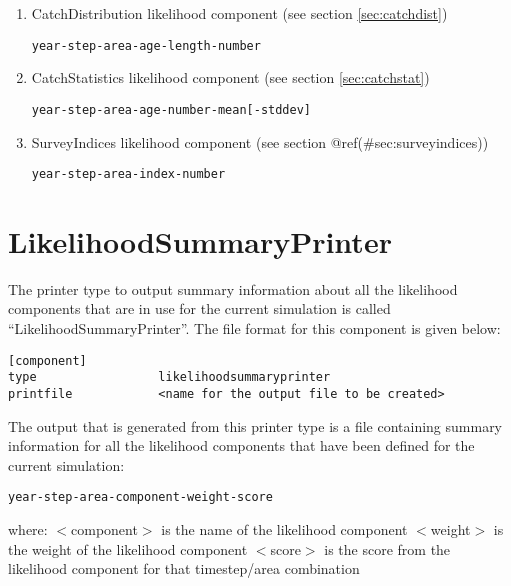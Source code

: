 \documentclass[]{book}
\begin{document}
\begin{enumerate}
\def\labelenumi{\arabic{enumi}.}
\item
  CatchDistribution likelihood component (see
  section \ref{sec:catchdist})

\begin{verbatim}
year-step-area-age-length-number
\end{verbatim}
\item
  CatchStatistics likelihood component (see
  section \ref{sec:catchstat})

\begin{verbatim}
year-step-area-age-number-mean[-stddev]
\end{verbatim}
\item
  SurveyIndices likelihood component (see
  section @ref(\#sec:surveyindices))

\begin{verbatim}
year-step-area-index-number
\end{verbatim}
\end{enumerate}

\hypertarget{sec:likelihoodsummaryprinter}{%
\section{LikelihoodSummaryPrinter}\label{sec:likelihoodsummaryprinter}}

The printer type to output summary information about all the likelihood
components that are in use for the current simulation is called
``LikelihoodSummaryPrinter''. The file format for this component is given
below:

\begin{verbatim}
[component]
type                 likelihoodsummaryprinter
printfile            <name for the output file to be created>
\end{verbatim}

The output that is generated from this printer type is a file containing
summary information for all the likelihood components that have been
defined for the current simulation:

\begin{verbatim}
year-step-area-component-weight-score
\end{verbatim}

where: \(<\)component\(>\) is the name of the likelihood component
\(<\)weight\(>\) is the weight of the likelihood component \(<\)score\(>\) is
the score from the likelihood component for that timestep/area
combination
\end{document}
